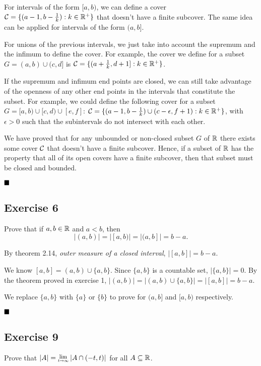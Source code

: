 For intervals of the form $[a,b)$, we can define a cover $\mathcal{C}=\{(a-1, b-\frac{1}{k}):k\in\mathbb{R}^+\}$ that doesn't have a finite subcover. The same idea can be applied for intervals of the form $(a,b]$.

For unions of the previous intervals, we just take into account the supremum and the infimum to define the cover. For example, the cover we define for a subset $G=(a,b)\cup(c,d]$ is $\mathcal{C} = \{(a+\frac{1}{k}, d+1]:k\in\mathbb{R}^+\}$.

If the supremum and infimum end points are closed, we can still take advantage of the openness of any other end points in the intervals that constitute the subset. For example, we could define the following cover for a subset $G=[a,b)\cup[c,d)\cup[e,f]$: $\mathcal{C}=\{(a-1,b-\frac{1}{k})\cup(c-\epsilon,f+1):k\in\mathbb{R}^+\}$, with $\epsilon>0$ such that the subintervals do not intersect with each other.

We have proved that for any unbounded or non-closed subset $G$ of $\mathbb{R}$ there exists some cover $\mathcal{C}$ that doesn't have a finite subcover. Hence, if a subset of $\mathbb{R}$ has the property that all of its open covers have a finite subcover, then that subset must be closed and bounded.

$\qed$

\subsection{Exercise 6}

\begin{formulationBox}
	Prove that if $a,b\in\mathbb{R}$ and $a<b$, then \[|(a,b)| = |[a,b)| = |(a,b]| = b-a.\]
\end{formulationBox}

By theorem 2.14, \textit{outer measure of a closed interval}, $|[a,b]| = b-a$.

We know $[a,b] = (a,b)\cup\{a,b\}$. Since $\{a,b\}$ is a countable set, $|\{a,b\}| = 0$. By the theorem proved in exercise 1, $|(a,b)| = |(a,b)\cup\{a,b\}| = |[a,b]| = b-a$.

We replace $\{a,b\}$ with $\{a\}$ or $\{b\}$ to prove for $(a,b]$ and $[a,b)$ respectively.

$\qed$

\subsection{Exercise 9}

\begin{formulationBox}
	Prove that $|A| = \Lim{t\rightarrow\infty}|A\cap(-t,t)|$ for all $A\subseteq\mathbb{R}$.
\end{formulationBox}

